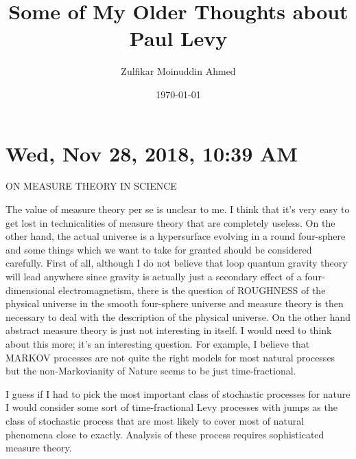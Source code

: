 \documentclass{amsart}
\title{Some of My Older Thoughts about Paul Levy}
\author{Zulfikar Moinuddin Ahmed}
\date{\today}
\begin{document}
\maketitle

\section{Wed, Nov 28, 2018, 10:39 AM}
ON MEASURE THEORY IN SCIENCE

The value of measure theory per se is unclear to me.  I think that it's very easy to get lost in technicalities of measure theory that are completely useless.  On the other hand, the actual universe is a hypersurface evolving in a round four-sphere and some things which we want to take for granted should be considered carefully.  First of all, although I do not believe that loop quantum gravity theory will lead anywhere since gravity is actually just a secondary effect of a four-dimensional electromagnetism, there is the question of ROUGHNESS of the physical universe in the smooth four-sphere universe and measure theory is then necessary to deal with the description of the physical universe.  On the other hand abstract measure theory is just not interesting in itself.  I would need to think about this more; it's an interesting question.  For example, I believe that MARKOV processes are not quite the right models for most natural processes but the non-Markovianity of Nature seems to be just time-fractional.

I guess if I had to pick the most important class of stochastic processes for nature I would consider some sort of time-fractional Levy processes with jumps as the class of stochastic process that are most likely to cover most of natural phenomena close to exactly.  Analysis of these process requires sophisticated measure theory.  
\end{document}

